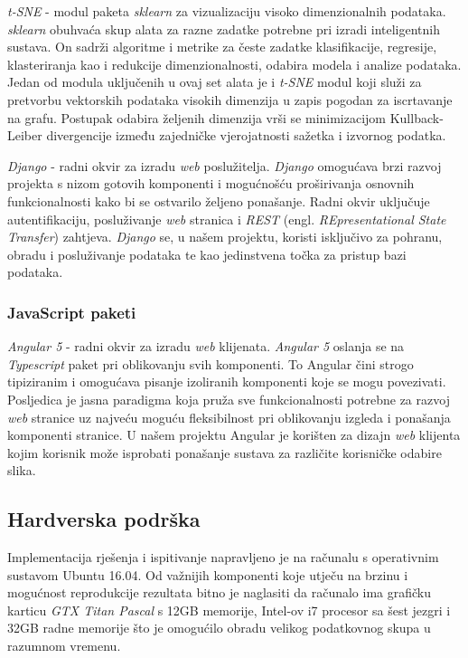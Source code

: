 \documentclass[times, utf8, proizvoljni, numeric]{fer}
\begin{document}
\textit{t-SNE}\cite{TSNE} - modul paketa \textit{sklearn} za vizualizaciju visoko dimenzionalnih podataka. \textit{sklearn} obuhvaća skup alata za razne zadatke potrebne pri izradi inteligentnih sustava. On sadrži algoritme i metrike za česte zadatke klasifikacije, regresije, klasteriranja kao i redukcije dimenzionalnosti, odabira modela i analize podataka. Jedan od modula uključenih u ovaj set alata je i \textit{t-SNE} modul koji služi za pretvorbu vektorskih podataka visokih dimenzija u zapis pogodan za iscrtavanje na grafu. Postupak odabira željenih dimenzija vrši se minimizacijom Kullback-Leiber divergencije između zajedničke vjerojatnosti sažetka i izvornog podatka.


\textit{Django} \cite{django}- radni okvir za izradu \textit{web} poslužitelja. \textit{Django} omogućava brzi razvoj projekta s nizom gotovih komponenti i mogućnošću proširivanja osnovnih funkcionalnosti kako bi se ostvarilo željeno ponašanje. Radni okvir uključuje autentifikaciju, posluživanje \textit{web} stranica i \textit{REST} (engl. \textit{REpresentational State Transfer}) zahtjeva. \textit{Django} se, u našem projektu, koristi isključivo za pohranu, obradu i posluživanje podataka te kao jedinstvena točka za pristup bazi podataka. 


\subsubsection{JavaScript paketi}

\textit{Angular 5} \cite{angular} - radni okvir za izradu \textit{web} klijenata. \textit{Angular 5} oslanja se na \textit{Typescript} paket pri oblikovanju svih komponenti. To Angular čini strogo tipiziranim i omogućava pisanje izoliranih komponenti koje se mogu povezivati. Posljedica je jasna paradigma koja pruža sve funkcionalnosti potrebne za razvoj \textit{web} stranice uz najveću moguću fleksibilnost pri oblikovanju izgleda i ponašanja komponenti stranice. U našem projektu Angular je korišten za dizajn \textit{web} klijenta kojim korisnik može isprobati ponašanje sustava za različite korisničke odabire slika.



\subsection{Hardverska podrška}
Implementacija rješenja i ispitivanje napravljeno je na računalu s operativnim sustavom Ubuntu 16.04. Od važnijih komponenti koje utječu na brzinu i mogućnost reprodukcije rezultata bitno je naglasiti da računalo ima grafičku karticu \textit{GTX Titan Pascal} s 12GB memorije, Intel-ov i7 procesor sa šest jezgri i 32GB radne memorije što je omogućilo obradu velikog podatkovnog skupa u razumnom vremenu.
\end{document}
